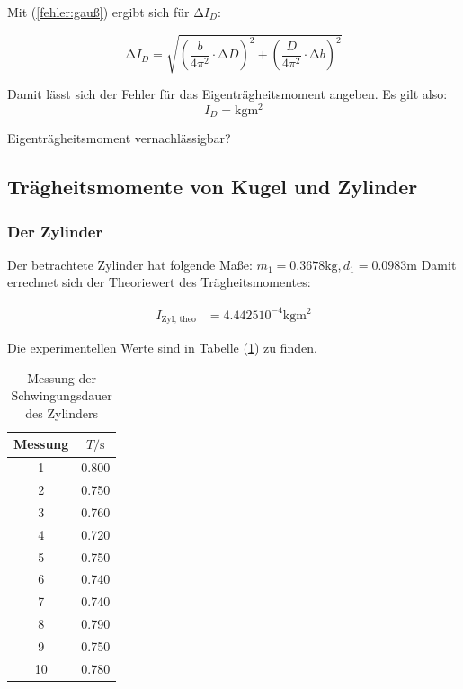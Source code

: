 Mit (\ref{fehler:gauß}) ergibt sich  für $\increment I_{D}$:

\begin{equation*}
  \increment I_{D} = \sqrt{\left(\frac{b}{4 \pi^2} \cdot  \increment D\right)^2 + \left(\frac{D}{4 \pi^2} \cdot  \increment b\right)^2}
\end{equation*}


Damit lässt sich der Fehler für das Eigenträgheitsmoment angeben. Es gilt also:
\begin{equation*}
  I_{D} =  \unit{\kilo\gram\meter\squared}
\end{equation*}

Eigenträgheitsmoment vernachlässigbar?

\subsection{Trägheitsmomente von Kugel und Zylinder}
\label{sec:KugelundZylinder}

\subsubsection*{Der Zylinder}
Der betrachtete Zylinder hat folgende Maße: $m_1 = 0.3678 \unit{\kilo\gram}, d_1 = 0.0983 \unit{\meter}$
Damit errechnet sich der Theoriewert des Trägheitsmomentes:

\begin{align*}
  I_{\text{Zyl, theo}} &= 4.4425 10^{-4} \unit{\kilo\gram\meter\squared}
\end{align*}

Die experimentellen Werte sind in Tabelle (\ref{tab:SchwingungsdauerZylinder}) zu finden.

\begin{table}
  \centering
  \caption{Messung der Schwingungsdauer des Zylinders}
  \label{tab:SchwingungsdauerZylinder}
  \begin{tabular}{c c}
    \toprule
     Messung &  $T / \unit\second$ \\
    \midrule
              1 &        0.800 \\
              2 &        0.750 \\
              3 &        0.760 \\
              4 &        0.720 \\
              5 &        0.750 \\
              6 &        0.740 \\
              7 &        0.740 \\
              8 &        0.790 \\
              9 &        0.750 \\
             10 &        0.780 \\
    \bottomrule
  \end{tabular}
\end{table}

